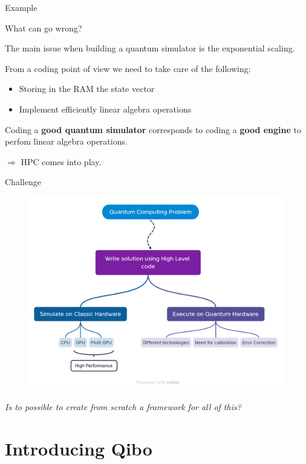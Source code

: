 \documentclass[11p,aspectratio=169]{beamer}
\begin{document}
\begin{frame}{Example}
\end{frame}


\begin{frame}{What can go wrong?}

    The main issue when building a quantum simulator is the exponential scaling.

    From a coding point of view we need to take care of the following:

    \pause
    \begin{itemize}
        \item Storing in the RAM the state vector
        \pause
        \item Implement efficiently linear algebra operations
    \end{itemize}
    \pause
    Coding a \textbf{good quantum simulator} corresponds to coding a \textbf{good engine} to perfom linear
    algebra operations.

    $\Rightarrow $  HPC comes into play.
    
\end{frame}

\begin{frame}{Challenge}
    \begin{figure}
        \includegraphics[width=\textwidth]{figures/intro.png}
    \end{figure}
    \centering
    \emph{Is to possible to create from scratch a framework for all of this?}
\end{frame}

\section{Introducing Qibo}
\end{document}
